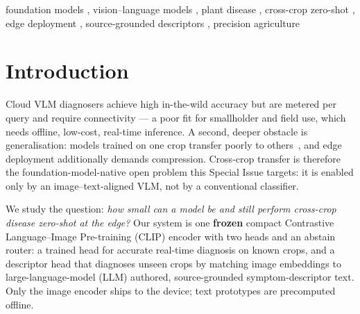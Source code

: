 \documentclass[a4paper,fleqn]{cas-dc}
\begin{document}
\begin{keywords}
foundation models \sep
vision--language models \sep
plant disease \sep
cross-crop zero-shot \sep
edge deployment \sep
source-grounded descriptors \sep
precision agriculture
\end{keywords}

\maketitle

\section{Introduction}

Cloud VLM diagnosers achieve high in-the-wild accuracy but are metered per query and
require connectivity --- a poor fit for smallholder and field use, which needs offline, low-cost,
real-time inference. A second, deeper obstacle is generalisation: models trained on one crop transfer
poorly to others~\citep{bouacida2025}, and edge deployment additionally demands compression. Cross-crop
transfer is
therefore the foundation-model-native open problem this Special Issue targets: it is enabled only by an
image--text-aligned VLM, not by a conventional classifier.

We study the question: \emph{how small can a model be and still perform cross-crop disease zero-shot at
the edge?} Our system is one \textbf{frozen} compact Contrastive Language--Image Pre-training (CLIP)
encoder with two heads and an abstain router: a trained head for accurate real-time diagnosis on known
crops, and a descriptor head that diagnoses unseen crops by matching image embeddings to
large-language-model (LLM) authored, source-grounded symptom-descriptor text.
Only the image encoder ships to the device; text prototypes are precomputed offline.

\end{document}
